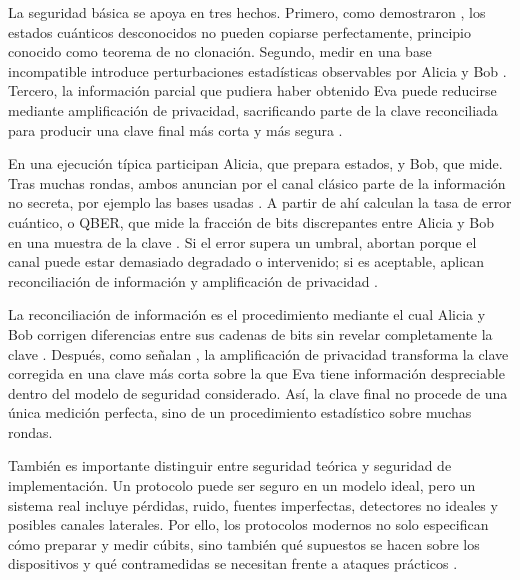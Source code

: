 La seguridad básica se apoya en tres hechos. Primero, como demostraron \cite{wootters1982}, los estados cuánticos desconocidos no pueden copiarse perfectamente, principio conocido como teorema de no clonación. Segundo, medir en una base incompatible introduce perturbaciones estadísticas observables por Alicia y Bob \citep{bennett1984,nielsen2010}. Tercero, la información parcial que pudiera haber obtenido Eva puede reducirse mediante amplificación de privacidad, sacrificando parte de la clave reconciliada para producir una clave final más corta y más segura \citep{gisin2002,scarani2009}.

En una ejecución típica participan Alicia, que prepara estados, y Bob, que mide. Tras muchas rondas, ambos anuncian por el canal clásico parte de la información no secreta, por ejemplo las bases usadas \citep{bennett1984,gisin2002}. A partir de ahí calculan la tasa de error cuántico, o QBER, que mide la fracción de bits discrepantes entre Alicia y Bob en una muestra de la clave \citep{gisin2002,scarani2009}. Si el error supera un umbral, abortan porque el canal puede estar demasiado degradado o intervenido; si es aceptable, aplican reconciliación de información y amplificación de privacidad \citep{scarani2009,lo2014}.

La reconciliación de información es el procedimiento mediante el cual Alicia y Bob corrigen diferencias entre sus cadenas de bits sin revelar completamente la clave \citep{gisin2002,scarani2009}. Después, como señalan \cite{scarani2009}, la amplificación de privacidad transforma la clave corregida en una clave más corta sobre la que Eva tiene información despreciable dentro del modelo de seguridad considerado. Así, la clave final no procede de una única medición perfecta, sino de un procedimiento estadístico sobre muchas rondas.

También es importante distinguir entre seguridad teórica y seguridad de implementación. Un protocolo puede ser seguro en un modelo ideal, pero un sistema real incluye pérdidas, ruido, fuentes imperfectas, detectores no ideales y posibles canales laterales. Por ello, los protocolos modernos no solo especifican cómo preparar y medir cúbits, sino también qué supuestos se hacen sobre los dispositivos y qué contramedidas se necesitan frente a ataques prácticos \citep{scarani2009,lo2014}.